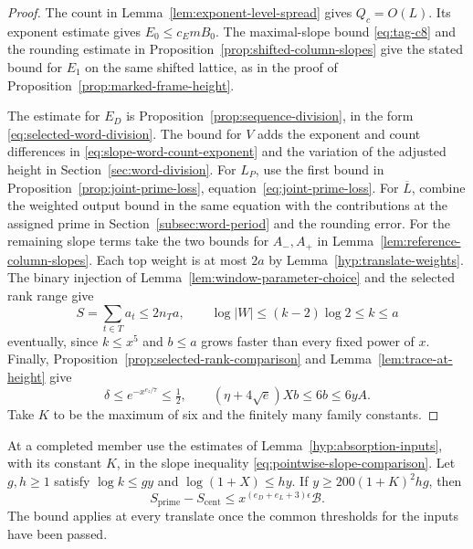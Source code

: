 \begin{proof}
The count in Lemma~\ref{lem:exponent-level-spread} gives \(Q_c=O(L)\).
Its exponent estimate gives \(E_0\le c_E m B_0\). The maximal-slope
bound \eqref{eq:tag-c8} and the rounding estimate in
Proposition~\ref{prop:shifted-column-slopes} give the stated bound for
\(E_1\) on the same shifted lattice, as in the proof of
Proposition~\ref{prop:marked-frame-height}.

The estimate for \(E_D\) is Proposition~\ref{prop:sequence-division}, in the form \eqref{eq:selected-word-division}. The bound for \(V\) adds the
exponent and count differences in \eqref{eq:slope-word-count-exponent}
and the variation of the adjusted height in
Section~\ref{sec:word-division}. For \(L_P\), use the first
bound in Proposition~\ref{prop:joint-prime-loss}, equation~\eqref{eq:joint-prime-loss}. For \(\overline L\),
combine the weighted output bound in the same equation with
the contributions at the assigned prime in
Section~\ref{subsec:word-period} and the rounding error.
For the remaining slope terms take the two bounds for \(A_-,A_+\)
in Lemma~\ref{lem:reference-column-slopes}. Each top weight is at most
\(2a\) by Lemma~\ref{hyp:translate-weights}. The binary injection of
Lemma~\ref{lem:window-parameter-choice} and the selected rank range give
\[
 S=\sum_{t\in T}a_t\le2n_Ta,\qquad
 \log|W|\le(k-2)\log2\le k\le a
\]
eventually, since \(k\le x^5\) and \(b\le a\) grows faster than
every fixed power of \(x\). Finally, Proposition~\ref{prop:selected-rank-comparison}
and Lemma~\ref{lem:trace-at-height} give
\[
 \delta\le e^{-x^{e_z/7}}\le\tfrac12,\qquad
 (\eta+4\sqrt e)Xb\le6b\le6yA .
\]
Take \(K\) to be the maximum of six and the finitely many family constants.
\end{proof}

\begin{lemma}\label{lem:absorption-at-point}
At a completed member use the estimates of Lemma~\ref{hyp:absorption-inputs},
with its constant \(K\), in the slope inequality
\eqref{eq:pointwise-slope-comparison}. Let \(g,h\ge1\) satisfy \(\log k\le gy\) and
\(\log(1+X)\le hy\). If \(y\ge200(1+K)^2hg\), then
\[
 S_{\mathrm{prime}}-S_{\mathrm{cent}}
      \le x^{(e_D+e_L+3)\epsilon}\mathcal B .
\]
The bound applies at every translate once the common thresholds
for the inputs have been passed.
\end{lemma}

